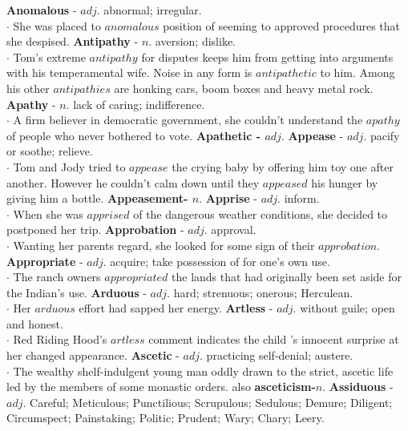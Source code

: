\documentclass{exam}
\begin{document}
\begin{questions}
 \question \textbf{Anomalous} - $adj.$  abnormal; irregular.\\
$\cdot$ She was placed to $anomalous$ position of seeming to approved procedures that she despised.  
 \question \textbf{Antipathy} - $n.$  aversion; dislike.\\
$\cdot$ Tom's extreme $antipathy$ for disputes keeps him from getting into arguments with his temperamental wife. Noise in any form is $antipathetic$ to him. Among his other $antipathies$ are honking cars, boom boxes and heavy metal rock.
 \question \textbf{Apathy} - $n.$  lack of caring; indifference.\\
$\cdot$ A firm believer in democratic government, she couldn't understand the $apathy$ of people who never bothered to vote. \textbf{Apathetic - $adj.$}
 \question \textbf{Appease} - $adj.$  pacify or soothe; relieve.\\
$\cdot$ Tom and Jody tried to $appease$ the crying baby by offering him toy one after another. However he couldn't calm down until they $appeased$ his hunger by giving him a bottle. \textbf{Appeasement- $n.$} 
 \question \textbf{Apprise} - $adj.$  inform.\\
$\cdot$ When she was $apprised$ of the dangerous weather conditions, she decided to postponed her trip.  
 \question \textbf{Approbation} - $adj.$  approval.\\
$\cdot$ Wanting her parents regard, she looked for some sign of their $approbation$.
 \question \textbf{Appropriate} - $adj.$  acquire; take possession of for one's own use.\\
$\cdot$ The ranch owners $appropriated$ the lands that had originally been set aside for the Indian's use.
 \question \textbf{Arduous} - $adj.$  hard; strenuous; onerous; Herculean.\\
$\cdot$ Her $arduous$ effort had sapped her energy.
 \question \textbf{Artless} - $adj.$  without guile; open and honest.\\
$\cdot$ Red Riding Hood's $artless$ comment  indicates the child 's innocent surprise at her  changed appearance. 
 \question \textbf{Ascetic} - $adj.$  practicing self-denial; austere.\\
$\cdot$ The wealthy shelf-indulgent young man oddly drawn to the strict, ascetic life led by the members of some monastic orders. also \textbf{asceticism-$n.$} 
 \question \textbf{Assiduous} - $adj.$ Careful; Meticulous; Punctilious; Scrupulous; Sedulous; Demure; Diligent; Circumspect; Painstaking; Politic; Prudent; Wary; Chary; Leery.\\

\end{questions}
\end{document}
